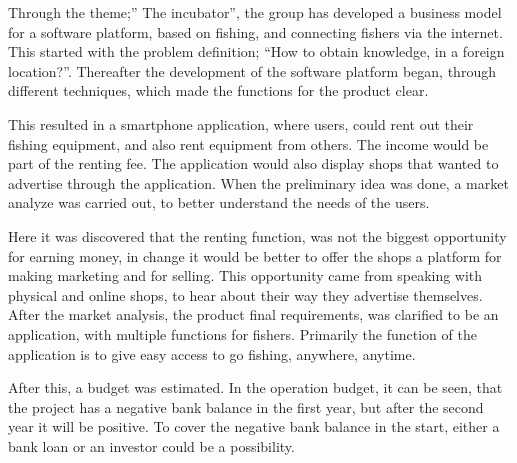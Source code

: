 \vspace{1cm}
\begin{center}
\begin{minipage}{0.5\textwidth}
Through the theme;” The incubator”, the group has developed a business model for a software platform, based on fishing, and connecting fishers via the internet. This started with the problem definition; “How to obtain knowledge, in a foreign location?”. 
Thereafter the development of the software platform began, through different techniques, which made the functions for the product clear. 

This resulted in a smartphone application, where users, could rent out their fishing equipment, and also rent equipment from others. The income would be part of the renting fee. The application would also display shops that wanted to advertise through the application. When the preliminary idea was done, a market analyze was carried out, to better understand the needs of the users. 

Here it was discovered that the renting function, was not the biggest opportunity for earning money, in change it would be better to offer the shops a platform for making marketing and for selling. This opportunity came from speaking with physical and online shops, to hear about their way they advertise themselves. After the market analysis, the product final requirements, was clarified to be an application, with multiple functions for fishers. Primarily the function of the application is to give easy access to go fishing, anywhere, anytime.


After this, a budget was estimated. In the operation budget, it can be seen, that the project has a negative bank balance in the first year, but after the second year it will be positive. To cover the negative bank balance in the start, either a bank loan or an investor could be a possibility. 
\end{minipage}	
\end{center}
